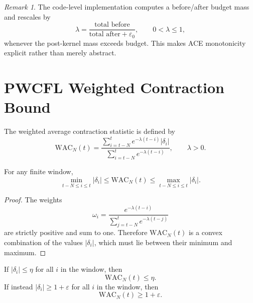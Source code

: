 \documentclass[12pt,a4paper]{article}
\theoremstyle{definition}
\theoremstyle{plain}
\theoremstyle{remark}
\newtheorem{remark}{Remark}[section]
\begin{document}
\begin{remark}
The code-level implementation computes a before/after budget mass and rescales by
\begin{equation}
\lambda = \frac{\text{total before}}{\text{total after} + \varepsilon_0},
\qquad 0<\lambda\le 1,
\end{equation}
whenever the post-kernel mass exceeds budget. This makes ACE monotonicity
explicit rather than merely abstract.
\end{remark}

\section{PWCFL Weighted Contraction Bound}

The weighted average contraction statistic is defined by
\begin{equation}
\mathrm{WAC}_N(t)=
\frac{\sum_{i=t-N}^{t} e^{-\lambda(t-i)} |\delta_i|}
{\sum_{i=t-N}^{t} e^{-\lambda(t-i)}},
\qquad \lambda > 0.
\end{equation}

\begin{proposition}
For any finite window,
\begin{equation}
\min_{t-N\le i\le t} |\delta_i| \le \mathrm{WAC}_N(t)
\le \max_{t-N\le i\le t} |\delta_i|.
\end{equation}
\end{proposition}

\begin{proof}
The weights
\begin{equation}
\omega_i = \frac{e^{-\lambda(t-i)}}{\sum_{j=t-N}^{t} e^{-\lambda(t-j)}}
\end{equation}
are strictly positive and sum to one. Therefore $\mathrm{WAC}_N(t)$ is a convex
combination of the values $|\delta_i|$, which must lie between their minimum and
maximum.
\end{proof}

\begin{corollary}
If $|\delta_i|\le \eta$ for all $i$ in the window, then
\begin{equation}
\mathrm{WAC}_N(t)\le \eta.
\end{equation}
If instead $|\delta_i|\ge 1+\varepsilon$ for all $i$ in the window, then
\begin{equation}
\mathrm{WAC}_N(t)\ge 1+\varepsilon.
\end{equation}
\end{corollary}
\end{document}
